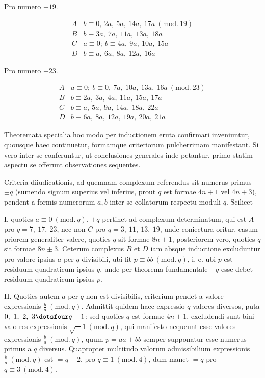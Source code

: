 %
\begin{center}Pro numero $-19$.\end{center}
\[
\begin{array}{c|l}
A&b\equiv0,\ 2a,\ 5a,\ 14a,\ 17a\ (\mathrm{mod.}\ 19)\\
B&b\equiv3a,\ 7a,\ 11a,\ 13a,\ 18a\\
C&a\equiv0;\ b\equiv4a,\ 9a,\ 10a,\ 15a\\
D&b\equiv a,\ 6a,\ 8a,\ 12a,\ 16a
\end{array}
\]

\begin{center}Pro numero $-23$.\end{center}
\[
\begin{array}{c|l}
A&a\equiv0;\ b\equiv0,\ 7a,\ 10a,\ 13a,\ 16a\ (\mathrm{mod.}\ 23)\\
B&b\equiv2a,\ 3a,\ 4a,\ 11a,\ 15a,\ 17a\\
C&b\equiv a,\ 5a,\ 9a,\ 14a,\ 18a,\ 22a\\
D&b\equiv6a,\ 8a,\ 12a,\ 19a,\ 20a,\ 21a
\end{array}
\]

Theoremata specialia hoc modo per inductionem eruta confirmari inveniuntur, quousque haec continuetur, formamque criteriorum pulcherrimam manifestant. Si vero inter se conferuntur, ut conclusiones generales inde petantur, primo statim aspectu se offerunt observationes sequentes.

Criteria diiudicationis, ad quemnam complexum referendus sit numerus primus $\pm q$ (sumendo signum superius vel inferius, prout $q$ est formae $4n+1$ vel $4n+3$), pendent a formis numerorum $a,b$ inter se collatorum respectu moduli $q$. Scilicet

I. quoties $a\equiv0\ (\mathrm{mod.}\ q)$, $\pm q$ pertinet ad complexum determinatum, qui est $A$ pro $q=7,\ 17,\ 23$, nec non $C$ pro $q=3,\ 11,\ 13,\ 19$, unde coniectura oritur, casum priorem generaliter valere, quoties $q$ sit formae $8n\pm1$, posteriorem vero, quoties $q$ sit formae $8n\pm3$. Ceterum complexus $B$ et $D$ iam absque inductione excluduntur pro valore ipsius $a$ per $q$ divisibili, ubi fit $p\equiv bb\ (\mathrm{mod.}\ q)$, i. e. ubi $p$ est residuum quadraticum ipsius $q$, unde per theorema fundamentale $\pm q$ esse debet residuum quadraticum ipsius $p$.

II. Quoties autem $a$ per $q$ non est divisibilis, criterium pendet a valore expressionis $\frac ba\ (\mathrm{mod.}\ q)$. Admittit quidem haec expressio $q$ valores diversos, puta $0,\ 1,\ 2,\ 3\dotsfour q-1$: sed quoties $q$ est formae $4n+1$, excludendi sunt bini valo%
%
res expressionis $\surd-1\ (\mathrm{mod.}\ q)$, qui manifesto nequeunt esse valores expressionis $\frac ba\ (\mathrm{mod.}\ q)$, quum $p=aa+bb$ semper supponatur esse numerus primus a $q$ diversus. Quapropter multitudo valorum admissibilium expressionis $\frac ba\ (\mathrm{mod.}\ q)$ est $=q-2$, pro $q\equiv1\ (\mathrm{mod.}\ 4)$, dum manet $=q$ pro $q\equiv3\ (\mathrm{mod.}\ 4)$.

